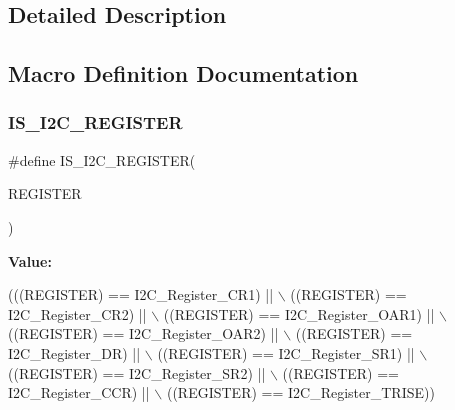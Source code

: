 \subsection{Detailed Description}


\subsection{Macro Definition Documentation}
\mbox{\label{group___i2_c__registers_ga37206b258f7930065c308ec7d35f243e}} 
\subsubsection{\texorpdfstring{I\+S\+\_\+\+I2\+C\+\_\+\+R\+E\+G\+I\+S\+T\+ER}{IS\_I2C\_REGISTER}}
{\footnotesize\ttfamily \#define I\+S\+\_\+\+I2\+C\+\_\+\+R\+E\+G\+I\+S\+T\+ER(\begin{DoxyParamCaption}\item[{}]{R\+E\+G\+I\+S\+T\+ER }\end{DoxyParamCaption})}

{\bfseries Value\+:}
\begin{DoxyCode}
(((REGISTER) == I2C\_Register\_CR1) || \(\backslash\)
                                   ((REGISTER) == I2C\_Register\_CR2) || \(\backslash\)
                                   ((REGISTER) == I2C\_Register\_OAR1) || \(\backslash\)
                                   ((REGISTER) == I2C\_Register\_OAR2) || \(\backslash\)
                                   ((REGISTER) == I2C\_Register\_DR) || \(\backslash\)
                                   ((REGISTER) == I2C\_Register\_SR1) || \(\backslash\)
                                   ((REGISTER) == I2C\_Register\_SR2) || \(\backslash\)
                                   ((REGISTER) == I2C\_Register\_CCR) || \(\backslash\)
                                   ((REGISTER) == I2C\_Register\_TRISE))
\end{DoxyCode}
